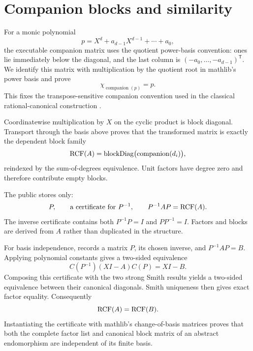 \section{Companion blocks and similarity}

For a monic polynomial
\[
  p=X^d+a_{d-1}X^{d-1}+\cdots+a_0,
\]
the executable companion matrix uses the quotient power-basis convention:
ones lie immediately below the diagonal, and the last column is
$(-a_0,\ldots,-a_{d-1})^\mathsf{T}$.  We identify this matrix with
multiplication by the quotient root in mathlib's power basis and prove
\[
  \chi_{\operatorname{companion}(p)}=p.
\]
This fixes the transpose-sensitive companion convention used in the classical
rational-canonical construction \citep[Chapter VI]{macduffee1943rcf}.

Coordinatewise multiplication by $X$ on the cyclic product is block
diagonal.  Transport through the basis above proves that the transformed
matrix is exactly the dependent block family
\[
  \operatorname{RCF}(A)=
  \operatorname{blockDiag}
    \bigl(\operatorname{companion}(d_i)\bigr),
\]
reindexed by the sum-of-degrees equivalence.  Unit factors have degree zero
and therefore contribute empty blocks.

The public  stores only:
\[
  P,\qquad \text{a certificate for }P^{-1},\qquad
  P^{-1}AP=\operatorname{RCF}(A).
\]
The inverse certificate contains both $P^{-1}P=I$ and $PP^{-1}=I$.  Factors
and blocks are derived from $A$ rather than duplicated in the structure.

For basis independence,  records a matrix
$P$, its chosen inverse, and $P^{-1}AP=B$.  Applying polynomial constants
gives a two-sided equivalence
\[
  C(P^{-1})(XI-A)C(P)=XI-B.
\]
Composing this certificate with the two strong Smith results yields a
two-sided equivalence between their canonical diagonals.  Smith uniqueness
then gives exact factor equality.  Consequently
\[
  \operatorname{RCF}(A)=\operatorname{RCF}(B).
\]
Instantiating the certificate with mathlib's change-of-basis matrices proves
that both the complete factor list and canonical block matrix of an abstract
endomorphism are independent of its finite basis.

